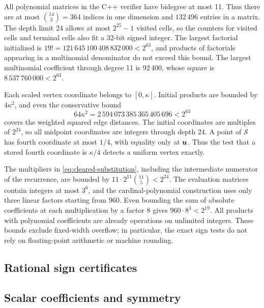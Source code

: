 All polynomial matrices in the C++ verifier have bidegree at most 11.
Thus there are at most $\binom{14}{3}=364$ indices in one dimension and
$132\,496$ entries in a matrix.  The depth limit 24 allows at most
$2^{25}-1$ visited cells, so the counters for visited cells and terminal
cells also fit a 32-bit signed integer.  The largest factorial initialized is
$19!=121\,645\,100\,408\,832\,000<2^{63}$, and products of factorials
appearing in a multinomial denominator do not exceed this bound.  The
largest multinomial coefficient through degree 11 is $92\,400$, whose
square is $8\,537\,760\,000<2^{63}$.

Each scaled vertex coordinate belongs to $[0,\kappa]$.  Initial products
are bounded by $4\kappa^2$, and even the conservative bound
\[
 64\kappa^2
 =2\,594\,073\,385\,365\,405\,696<2^{63}
\]
covers the weighted squared edge distances.  The initial coordinates are
multiples of $2^{24}$, so all midpoint coordinates are integers through
depth 24.  A point of $\mathcal S$ has fourth coordinate at most $1/4$, with
equality only at $\boldsymbol u$.  Thus the test that a stored fourth coordinate is
$\kappa/4$ detects a uniform vertex exactly.

The multipliers in \eqref{eq:cleared-substitution}, including the
intermediate numerator of the recurrence, are bounded by
$11\cdot2^{11}\binom{11}{5}<2^{24}$.  The evaluation matrices contain
integers at most $3^6$, and the cardinal-polynomial construction uses only
three linear factors starting from 960.  Even bounding the sum of absolute
coefficients at each multiplication by a factor 8 gives
$960\cdot8^3<2^{19}$.  All products with polynomial coefficients are already
operations on unlimited integers.  These bounds exclude fixed-width
overflow; in particular, the exact sign tests do not rely on floating-point
arithmetic or machine rounding.

\subsection{Rational sign certificates}
\begingroup
{}

\endgroup

\subsection{Scalar coefficients and symmetry}

